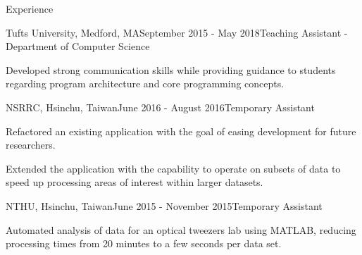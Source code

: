 \documentclass{resume} %
\begin{document}

\begin{rSection}{Experience}


\begin{rSubsection}{Tufts University, Medford, MA}{September 2015 -
    May 2018}{Teaching Assistant - Department of Computer Science}

\item Developed strong communication skills while providing guidance to
    students regarding program architecture and core programming concepts.

\end{rSubsection}

\begin{rSubsection}{NSRRC, Hsinchu, Taiwan}{June 2016 - August 2016}{Temporary
    Assistant}

\item Refactored an existing application with the goal of easing development
    for future researchers.

\item Extended the application with the capability to operate on subsets of
    data to speed up processing areas of interest within larger datasets.

\end{rSubsection}

\begin{rSubsection}{NTHU, Hsinchu, Taiwan}{June 2015 - November
    2015}{Temporary Assistant}

\item Automated analysis of data for an optical tweezers lab using MATLAB,
    reducing processing times from 20 minutes to a few seconds per data set.

\end{rSubsection}

\bigskip

\end{rSection}

\end{document}
